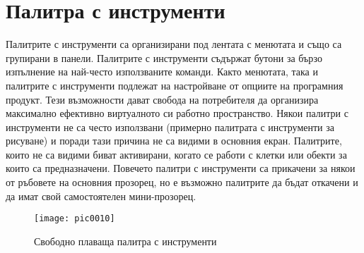 \section{Палитра с инструменти}

Палитрите с инструменти са организирани под лентата с менютата и също са групирани в панели. Палитрите с инструменти съдържат бутони за бързо изпълнение на най-често използваните команди. Както менютата, така и палитрите с инструменти подлежат на настройване от опциите на програмния продукт. Тези възможности дават свобода на потребителя да организира максимално ефективно виртуалното си работно пространство. Някои палитри с инструменти не са често използвани (примерно палитрата с инструменти за рисуване) и поради тази причина не са видими в основния екран. Палитрите, които не са видими биват активирани, когато се работи с клетки или обекти за които са предназначени. Повечето палитри с инструменти са прикачени за някои от ръбовете на основния прозорец, но е възможно палитрите да бъдат откачени и да имат свой самостоятелен мини-прозорец. 

\begin{figure}[h!]
  \centering
  \texttt{[image: pic0010]}
  \caption{Свободно плаваща палитра с инструменти}
\label{figure0010}
\end{figure}
\FloatBarrier

